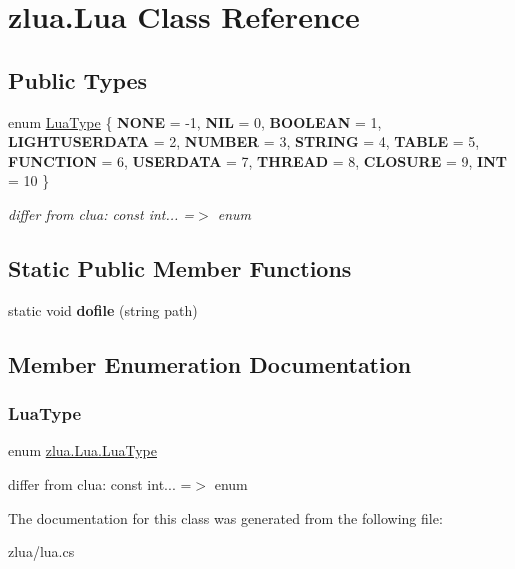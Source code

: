 \hypertarget{classzlua_1_1_lua}{}\section{zlua.\+Lua Class Reference}
\label{classzlua_1_1_lua}
\subsection*{Public Types}
\begin{DoxyCompactItemize}
\item 
enum \mbox{\hyperlink{classzlua_1_1_lua_a3bea46ecc2aabf23ac160bd7e7172e70}{Lua\+Type}} \{ \newline
{\bfseries N\+O\+NE} = -\/1, 
{\bfseries N\+IL} = 0, 
{\bfseries B\+O\+O\+L\+E\+AN} = 1, 
{\bfseries L\+I\+G\+H\+T\+U\+S\+E\+R\+D\+A\+TA} = 2, 
\newline
{\bfseries N\+U\+M\+B\+ER} = 3, 
{\bfseries S\+T\+R\+I\+NG} = 4, 
{\bfseries T\+A\+B\+LE} = 5, 
{\bfseries F\+U\+N\+C\+T\+I\+ON} = 6, 
\newline
{\bfseries U\+S\+E\+R\+D\+A\+TA} = 7, 
{\bfseries T\+H\+R\+E\+AD} = 8, 
{\bfseries C\+L\+O\+S\+U\+RE} = 9, 
{\bfseries I\+NT} = 10
 \}
\begin{DoxyCompactList}\small\item\em differ from clua\+: const int... =$>$ enum \end{DoxyCompactList}\end{DoxyCompactItemize}
\subsection*{Static Public Member Functions}
\begin{DoxyCompactItemize}
\item 
\mbox{\label{classzlua_1_1_lua_ab7314880982fac295dd0eb6852465b6d}} 
static void {\bfseries dofile} (string path)
\end{DoxyCompactItemize}


\subsection{Member Enumeration Documentation}
\mbox{\label{classzlua_1_1_lua_a3bea46ecc2aabf23ac160bd7e7172e70}} 
\subsubsection{\texorpdfstring{Lua\+Type}{LuaType}}
{\footnotesize\ttfamily enum \mbox{\hyperlink{classzlua_1_1_lua_a3bea46ecc2aabf23ac160bd7e7172e70}{zlua.\+Lua.\+Lua\+Type}}\hspace{0.3cm}{\ttfamily [strong]}}



differ from clua\+: const int... =$>$ enum 



The documentation for this class was generated from the following file\+:\begin{DoxyCompactItemize}
\item 
zlua/lua.\+cs\end{DoxyCompactItemize}
